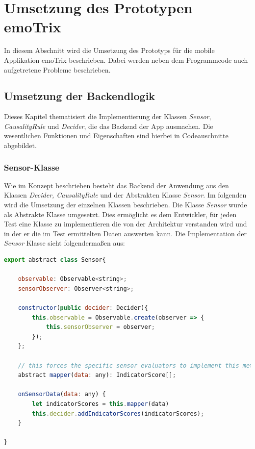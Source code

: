 \section{Umsetzung des Prototypen emoTrix}
In diesem Abschnitt wird die Umsetzung des Prototyps für die mobile Applikation emoTrix beschrieben. Dabei werden neben dem Programmcode auch aufgetretene Probleme beschrieben.
\subsection{Umsetzung der Backendlogik}
Dieses Kapitel thematisiert die Implementierung der Klassen \textit{Sensor}, \textit{CausalityRule} und \textit{Decider}, die das Backend der App ausmachen. Die wesentlichen Funktionen und Eigenschaften sind hierbei in Codeauschnitte abgebildet.
\subsubsection{Sensor-Klasse}
Wie im Konzept beschrieben besteht das Backend der Anwendung aus den Klassen \textit{Decider, CausalityRule} und der Abstrakten Klasse \textit{Sensor}. Im folgenden wird die Umsetzung der einzelnen Klassen beschrieben.\newline
Die Klasse \textit{Sensor} wurde als Abstrakte Klasse umgesetzt. Dies ermöglicht es dem Entwickler, für jeden Test eine Klasse zu implementieren die von der Architektur verstanden wird und in der er die im Test ermittelten Daten auswerten kann. Die Implementation der \textit{Sensor} Klasse sieht folgendermaßen aus: \newline
\begin{lstlisting}[caption={abstrakte Klasse Sensor},language=JavaScript]
export abstract class Sensor{

	observable: Observable<string>;
	sensorObserver: Observer<string>;

	constructor(public decider: Decider){
		this.observable = Observable.create(observer => {
			this.sensorObserver = observer;
		});
	};

	// this forces the specific sensor evaluators to implement this method
	abstract mapper(data: any): IndicatorScore[]; 

	onSensorData(data: any) {
		let indicatorScores = this.mapper(data)
		this.decider.addIndicatorScores(indicatorScores);
	}

}
\end{lstlisting}
